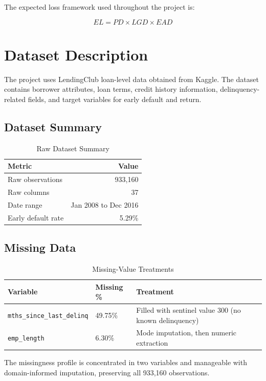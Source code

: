\documentclass[12pt]{article}
\begin{document}
The expected loss framework used throughout the project is:

\begin{equation}
    EL = PD \times LGD \times EAD
\end{equation}

\section{Dataset Description}

The project uses LendingClub loan-level data obtained from Kaggle. The dataset contains borrower attributes, loan terms, credit history information, delinquency-related fields, and target variables for early default and return.

\subsection{Dataset Summary}

\begin{table}[H]
\centering
\caption{Raw Dataset Summary}
\begin{tabular}{lr}
\toprule
Metric & Value \\
\midrule
Raw observations & 933,160 \\
Raw columns & 37 \\
Date range & Jan 2008 to Dec 2016 \\
Early default rate & 5.29\% \\
\bottomrule
\end{tabular}
\end{table}

\subsection{Missing Data}

\begin{table}[H]
\centering
\caption{Missing-Value Treatments}
\begin{tabular}{lll}
\toprule
Variable & Missing \% & Treatment \\
\midrule
\texttt{mths\_since\_last\_delinq} & 49.75\% & Filled with sentinel value 300 (no known delinquency) \\
\texttt{emp\_length} & 6.30\% & Mode imputation, then numeric extraction \\
\bottomrule
\end{tabular}
\end{table}

The missingness profile is concentrated in two variables and manageable with domain-informed imputation, preserving all 933,160 observations.
\end{document}
